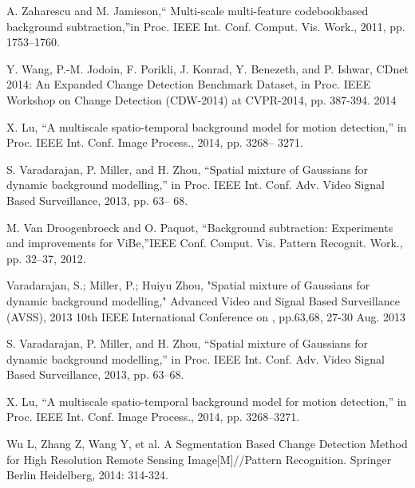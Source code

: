 \documentclass[runningheads,a4paper]{llncs}
\begin{document}
\begin{thebibliography}{4}
 A. Zaharescu and M. Jamieson,“
    Multi-scale multi-feature codebookbased background subtraction,”in Proc.
    IEEE Int. Conf. Comput. Vis. Work., 2011, pp. 1753–1760.


 Y. Wang, P.-M. Jodoin, F. Porikli, J. Konrad, Y.
    Benezeth, and P. Ishwar, CDnet 2014: An Expanded Change Detection Benchmark
    Dataset, in Proc. IEEE Workshop on Change Detection (CDW-2014) at
    CVPR-2014, pp. 387-394. 2014

 X. Lu, “A multiscale spatio-temporal
    background model for motion detection,” in Proc. IEEE Int. Conf. Image
    Process., 2014, pp. 3268– 3271.

 S. Varadarajan, P. Miller, and H.
    Zhou, “Spatial mixture of Gaussians for dynamic background modelling,” in
    Proc. IEEE Int. Conf. Adv. Video Signal Based Surveillance, 2013, pp. 63–
    68.

 M. Van Droogenbroeck and O. Paquot, “Background
    subtraction: Experiments and improvements for ViBe,”IEEE Conf. Comput. Vis.
    Pattern Recognit. Work., pp. 32–37, 2012.

 Varadarajan, S.; Miller, P.; Huiyu Zhou,
    "Spatial mixture of Gaussians for dynamic background modelling," Advanced
    Video and Signal Based Surveillance (AVSS), 2013 10th IEEE International
    Conference on , pp.63,68, 27-30 Aug. 2013


 S. Varadarajan, P. Miller, and H. Zhou, “Spatial
    mixture of Gaussians for dynamic background modelling,” in Proc. IEEE Int.
    Conf. Adv. Video Signal Based Surveillance, 2013, pp. 63–68.

 X. Lu, “A multiscale spatio-temporal background model
    for motion detection,” in Proc. IEEE Int. Conf. Image Process., 2014, pp.
    3268–3271.

 Wu L, Zhang Z, Wang Y, et al. A Segmentation Based
    Change Detection Method for High Resolution Remote Sensing
    Image[M]//Pattern Recognition. Springer Berlin Heidelberg, 2014: 314-324.


\end{thebibliography}
\end{document}
